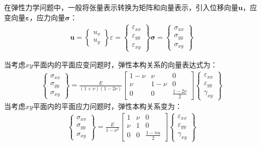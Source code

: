 \documentclass[a4paper]{ctexbook}
\begin{document}
在弹性力学问题中，一般将张量表示转换为矩阵和向量表示，引入位移向量$\pmb{u}$，应变向量$\pmb{\varepsilon}$，应力向量$\pmb{\sigma}$：
\begin{equation}
\begin{split}
    \pmb{u}=\left\{\begin{matrix} u_x\\u_y\end{matrix}\right\}
    \varepsilon=\left\{\begin{matrix}
        \varepsilon_{xx}\\\varepsilon_{yy}\\\varepsilon_{xy}
    \end{matrix}\right\}
    \pmb{\sigma}=\left\{\begin{matrix}
        \sigma_{xx}\\\sigma_{yy}\\\sigma_{xy}
    \end{matrix}\right\}
\end{split}
\end{equation}\par
当考虑$xy$平面内的平面应变问题时，弹性本构关系的向量表达式为：
\begin{equation}
\begin{split}
    \left\{\begin{matrix}
        \sigma_{xx}\\\sigma_{yy}\\\sigma_{xy}
    \end{matrix}\right\}=\frac{E}{(1+\nu)(1-2\nu)}
    \left[\begin{matrix}
        1-\nu&\nu&0\\\nu&1-\nu&0\\0&0&\frac{1-2\nu}{2}
    \end{matrix}\right]
    \left\{\begin{matrix}
        \varepsilon_{xx}\\\varepsilon_{yy}\\\gamma_{xy}
    \end{matrix}\right\}
\end{split}
\end{equation}
当考虑$xy$平面内的平面应力问题时，弹性本构关系变为：
\begin{equation}
\begin{split}
    \left\{\begin{matrix}
        \sigma_{xx}\\\sigma_{yy}\\\sigma_{xy}
        \end{matrix}\right\}=\frac{E}{1-\nu^2}
        \left[\begin{matrix}
        1&\nu&0\\\nu&1&0\\0&0&\frac{1-nu}{2}
        \end{matrix}\right]
        \left\{\begin{matrix}
        \varepsilon_{xx}\\\varepsilon_{yy}\\\gamma_{xy}
    \end{matrix}\right\}
\end{split}
\end{equation}\par
\end{document}
